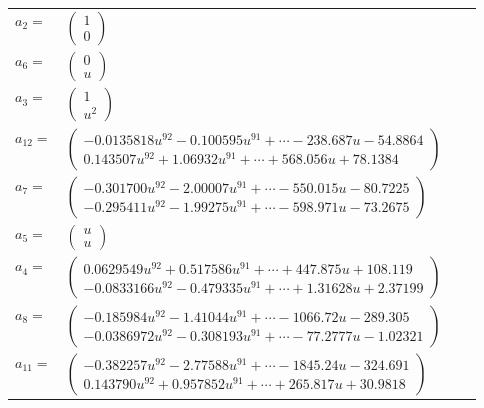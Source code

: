 \documentclass[1p]{elsarticle_modified}
\theoremstyle{definition}
\begin{document}
\begin{tabular}{m{7pt} m{180pt} m{7pt} m{180pt} }
\flushright $a_{2}=$&$\begin{pmatrix}1\\0\end{pmatrix}$ \\
\flushright $a_{6}=$&$\begin{pmatrix}0\\u\end{pmatrix}$ \\
\flushright $a_{3}=$&$\begin{pmatrix}1\\u^2\end{pmatrix}$ \\
\flushright $a_{12}=$&$\begin{pmatrix}-0.0135818 u^{92}-0.100595 u^{91}+\cdots-238.687 u-54.8864\\0.143507 u^{92}+1.06932 u^{91}+\cdots+568.056 u+78.1384\end{pmatrix}$ \\
\flushright $a_{7}=$&$\begin{pmatrix}-0.301700 u^{92}-2.00007 u^{91}+\cdots-550.015 u-80.7225\\-0.295411 u^{92}-1.99275 u^{91}+\cdots-598.971 u-73.2675\end{pmatrix}$ \\
\flushright $a_{5}=$&$\begin{pmatrix}u\\u\end{pmatrix}$ \\
\flushright $a_{4}=$&$\begin{pmatrix}0.0629549 u^{92}+0.517586 u^{91}+\cdots+447.875 u+108.119\\-0.0833166 u^{92}-0.479335 u^{91}+\cdots+1.31628 u+2.37199\end{pmatrix}$ \\
\flushright $a_{8}=$&$\begin{pmatrix}-0.185984 u^{92}-1.41044 u^{91}+\cdots-1066.72 u-289.305\\-0.0386972 u^{92}-0.308193 u^{91}+\cdots-77.2777 u-1.02321\end{pmatrix}$ \\
\flushright $a_{11}=$&$\begin{pmatrix}-0.382257 u^{92}-2.77588 u^{91}+\cdots-1845.24 u-324.691\\0.143790 u^{92}+0.957852 u^{91}+\cdots+265.817 u+30.9818\end{pmatrix}$ \\

\end{tabular}
\end{document}
